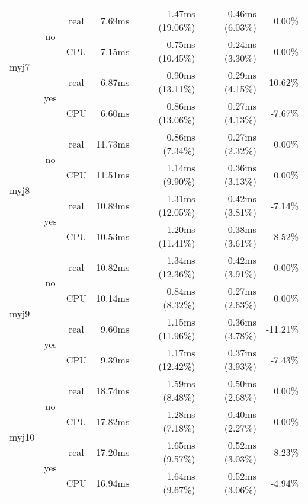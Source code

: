 \documentclass[en]{pracamgr}
\begin{document}
\begin{small}
\begin{longtable}{|l|c|c|r|r|r|r|}
\hline
\multirow{4}{*}{myj7}     & \multirow{2}{*}{no}  & real & 7.69ms & 1.47ms (19.06\%) & 0.46ms (6.03\%) & 0.00\% \\*
                          &                      & CPU  & 7.15ms & 0.75ms (10.45\%) & 0.24ms (3.30\%) & 0.00\% \\*
                          \cline{2-7}
                          & \multirow{2}{*}{yes} & real & 6.87ms & 0.90ms (13.11\%) & 0.29ms (4.15\%) & -10.62\% \\*
                          &                      & CPU  & 6.60ms & 0.86ms (13.06\%) & 0.27ms (4.13\%) & -7.67\% \\
\hline
\multirow{4}{*}{myj8}     & \multirow{2}{*}{no}  & real & 11.73ms & 0.86ms (7.34\%) & 0.27ms (2.32\%) & 0.00\% \\*
                          &                      & CPU  & 11.51ms & 1.14ms (9.90\%) & 0.36ms (3.13\%) & 0.00\% \\*
                          \cline{2-7}
                          & \multirow{2}{*}{yes} & real & 10.89ms & 1.31ms (12.05\%) & 0.42ms (3.81\%) & -7.14\% \\*
                          &                      & CPU  & 10.53ms & 1.20ms (11.41\%) & 0.38ms (3.61\%) & -8.52\% \\
\hline
\multirow{4}{*}{myj9}     & \multirow{2}{*}{no}  & real & 10.82ms & 1.34ms (12.36\%) & 0.42ms (3.91\%) & 0.00\% \\*
                          &                      & CPU  & 10.14ms & 0.84ms (8.32\%) & 0.27ms (2.63\%) & 0.00\% \\*
                          \cline{2-7}
                          & \multirow{2}{*}{yes} & real & 9.60ms & 1.15ms (11.96\%) & 0.36ms (3.78\%) & -11.21\% \\*
                          &                      & CPU  & 9.39ms & 1.17ms (12.42\%) & 0.37ms (3.93\%) & -7.43\% \\
\hline
\multirow{4}{*}{myj10}    & \multirow{2}{*}{no}  & real & 18.74ms & 1.59ms (8.48\%) & 0.50ms (2.68\%) & 0.00\% \\*
                          &                      & CPU  & 17.82ms & 1.28ms (7.18\%) & 0.40ms (2.27\%) & 0.00\% \\*
                          \cline{2-7}
                          & \multirow{2}{*}{yes} & real & 17.20ms & 1.65ms (9.57\%) & 0.52ms (3.03\%) & -8.23\% \\*
                          &                      & CPU  & 16.94ms & 1.64ms (9.67\%) & 0.52ms (3.06\%) & -4.94\% \\

\end{longtable}
\end{small}
\end{document}

